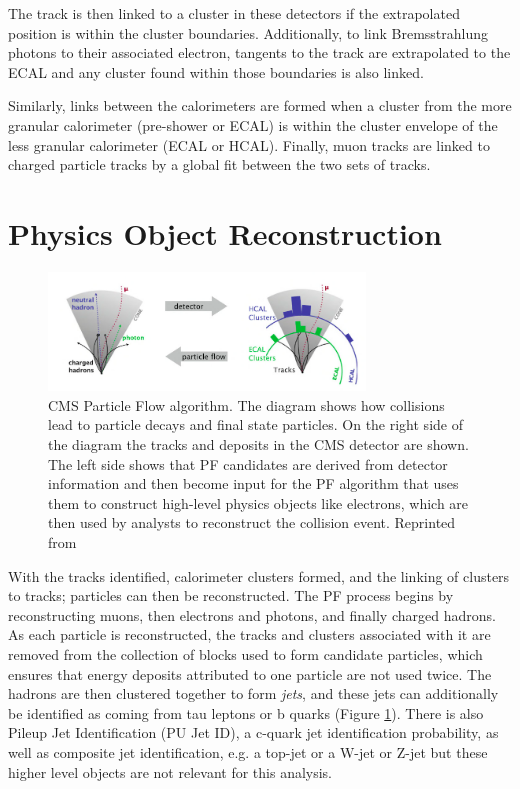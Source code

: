  The track is then linked to a cluster in these detectors if the extrapolated position is within the cluster boundaries. Additionally, to link Bremsstrahlung photons to their associated electron, tangents to the track are extrapolated to the ECAL and any cluster found within those boundaries is also linked.

 Similarly, links between the calorimeters are formed when a cluster from the more granular calorimeter (pre-shower or ECAL) is within the cluster envelope of the less granular calorimeter (ECAL or HCAL). Finally, muon tracks are linked to charged particle tracks by a global fit between the two sets of tracks.

 \section{Physics Object Reconstruction}

  \begin{figure}[h]
 	\centering
 	\includegraphics[width=0.75\textwidth]{figures/jets.png}
 	\singlespace
 	\caption{CMS Particle Flow algorithm. The diagram shows how collisions lead to particle decays and final state particles. On the right side of the diagram the tracks and deposits in the CMS detector are shown. The left side shows that PF candidates are derived from detector information and then become input for the PF algorithm that uses them to construct high-level physics objects like electrons, which are then used by analysts to reconstruct the collision event. Reprinted from \cite{CMS-PAS-PFT-09-001}}
  	\label{fig:pf} 	
 \end{figure}

With the tracks identified, calorimeter clusters formed, and the linking of clusters to tracks; particles can then be reconstructed. The PF process begins by reconstructing muons, then electrons and photons, and finally charged hadrons. As each particle is reconstructed, the tracks and clusters associated with it are removed from the collection of blocks used to form candidate particles, which ensures that energy deposits attributed to one particle are not used twice. The hadrons are then clustered together to form \textit{jets}, and these jets can additionally be identified as coming from tau leptons or b quarks\cite{Sirunyan_2017,PhysRevD.94.112002} (Figure \ref{fig:pf}). There is also Pileup Jet Identification (PU Jet ID)\cite{PFJetID}, a c-quark jet identification probability, as well as composite jet identification, e.g. a top-jet or a W-jet or Z-jet but these higher level objects are not relevant for this analysis.

